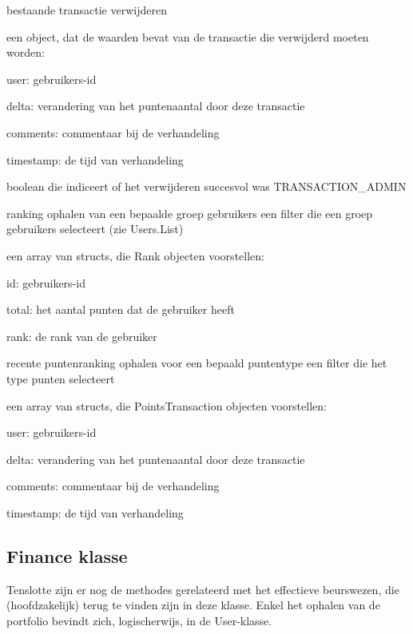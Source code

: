 	{ bestaande transactie verwijderen }
	{ een object, dat de waarden bevat van de transactie die verwijderd moeten worden:
		\begin{itemize_compact}
		\item{user: gebruikers-id}
		\item{delta: verandering van het puntenaantal door deze transactie}
		\item{comments: commentaar bij de verhandeling}
		\item{timestamp: de tijd van verhandeling}
		\end{itemize_compact} }
	{ boolean die indiceert of het verwijderen succesvol was }
	{ TRANSACTION\_ADMIN }

	{ ranking ophalen van een bepaalde groep gebruikers }
	{ een filter die een groep gebruikers selecteert (zie Users.List) }
	{ een array van structs, die Rank objecten voorstellen:
		\begin{itemize_compact}
		\item{id: gebruikers-id}
		\item{total: het aantal punten dat de gebruiker heeft}
		\item{rank: de rank van de gebruiker}
		\end{itemize_compact} }
		
	{ recente puntenranking ophalen voor een bepaald puntentype }
	{ een filter die het type punten selecteert }
	{ een array van structs, die PointsTransaction objecten voorstellen:
		\begin{itemize_compact}
		\item{user: gebruikers-id}
		\item{delta: verandering van het puntenaantal door deze transactie}
		\item{comments: commentaar bij de verhandeling}
		\item{timestamp: de tijd van verhandeling}
		\end{itemize_compact} }		

\subsection{Finance klasse}

Tenslotte zijn er nog de methodes gerelateerd met het effectieve beurswezen, die (hoofdzakelijk) terug te vinden zijn in deze klasse. Enkel het ophalen van de portfolio bevindt zich, logischerwijs, in de User-klasse.

